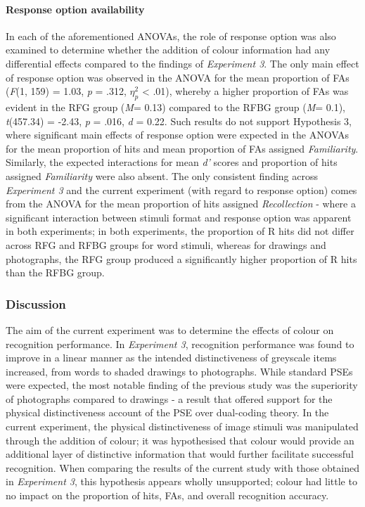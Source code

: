 \documentclass[
  11pt,
]{article}
\begin{document}
\hypertarget{response-option-availability-1}{%
\paragraph{Response option
availability}\label{response-option-availability-1}}

\hfill\break In each of the aforementioned ANOVAs, the role of response
option was also examined to determine whether the addition of colour
information had any differential effects compared to the findings of
\emph{Experiment 3}. The only main effect of response option was
observed in the ANOVA for the mean proportion of FAs (\emph{F}(1, 159) =
1.03, \emph{p} = .312, \(\eta^2_p\) \textless{} .01), whereby a higher
proportion of FAs was evident in the RFG group (\emph{M}= 0.13) compared
to the RFBG group (\emph{M}= 0.1), \emph{t}(457.34) = -2.43, \emph{p} =
.016, \emph{d} = 0.22. Such results do not support Hypothesis 3, where
significant main effects of response option were expected in the ANOVAs
for the mean proportion of hits and mean proportion of FAs assigned
\emph{Familiarity}. Similarly, the expected interactions for mean
\emph{d'} scores and proportion of hits assigned \emph{Familiarity} were
also absent. The only consistent finding across \emph{Experiment 3} and
the current experiment (with regard to response option) comes from the
ANOVA for the mean proportion of hits assigned \emph{Recollection} -
where a significant interaction between stimuli format and response
option was apparent in both experiments; in both experiments, the
proportion of R hits did not differ across RFG and RFBG groups for word
stimuli, whereas for drawings and photographs, the RFG group produced a
significantly higher proportion of R hits than the RFBG group.

\hypertarget{discussion-3}{%
\subsubsection{Discussion}\label{discussion-3}}

The aim of the current experiment was to determine the effects of colour
on recognition performance. In \emph{Experiment 3}, recognition
performance was found to improve in a linear manner as the intended
distinctiveness of greyscale items increased, from words to shaded
drawings to photographs. While standard PSEs were expected, the most
notable finding of the previous study was the superiority of photographs
compared to drawings - a result that offered support for the physical
distinctiveness account of the PSE over dual-coding theory. In the
current experiment, the physical distinctiveness of image stimuli was
manipulated through the addition of colour; it was hypothesised that
colour would provide an additional layer of distinctive information that
would further facilitate successful recognition. When comparing the
results of the current study with those obtained in \emph{Experiment 3},
this hypothesis appears wholly unsupported; colour had little to no
impact on the proportion of hits, FAs, and overall recognition accuracy.
\end{document}

